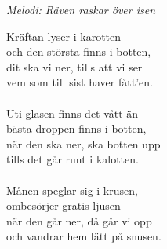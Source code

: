 {\footnotesize\textit{Melodi: Räven raskar över isen}}\par
\vspace{10pt}
Kräftan lyser i karotten\\
och den största finns i botten,\\
dit ska vi ner, tills att vi ser\\
vem som till sist haver fått'en.\\
\\
Uti glasen finns det vått än\\
bästa droppen finns i botten,\\
när den ska ner, ska botten upp\\
tills det går runt i kalotten.\\
\\
Månen speglar sig i krusen,\\
ombesörjer gratis ljusen\\
när den går ner, då går vi opp\\
och vandrar hem lätt på snusen.
